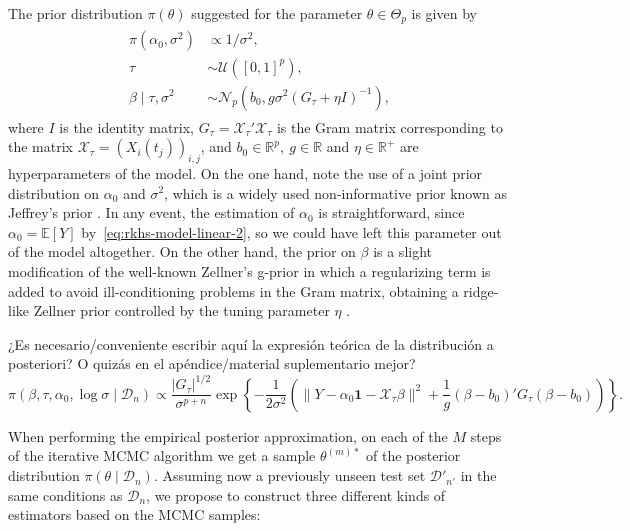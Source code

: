 \documentclass[ba]{imsart}
\numberwithin{equation}{section}
\theoremstyle{plain}
\newcommand{\R}{\mathbb{R}}
\newcommand{\E}{\mathbb{E}}
\newenvironment{comment}
{
\noindent \em \color{red}
}
{
\color{black}
}
\begin{document}
The prior distribution \(\pi(\theta)\) suggested for the parameter \(\theta \in \Theta_p\) is given by
\begin{align}\label{eq:prior-linear}
  \begin{split}
  \pi(\alpha_0, \sigma^2)              & \propto 1/\sigma^2,                                                     \\
  \tau                     & \sim \mathcal U([0, 1]^p),                                              \\
  \beta\mid \tau, \sigma^2 & \sim \mathcal N_p(b_0, g\sigma^2(G_\tau + \eta I)^{-1}),
\end{split}
\end{align}
where \(I\) is the identity matrix, \(G_\tau = \mathcal X_\tau'\mathcal X_\tau\) is the Gram matrix corresponding to the matrix \(\mathcal X_\tau = (X_i(t_j))_{i,j}\), and \(b_0\in \R^p, \ g \in \R\) and \(\eta \in \R^+\) are hyperparameters of the model. On the one hand, note the use of a joint prior distribution on \(\alpha_0\) and \(\sigma^2\), which is a widely used non-informative prior known as Jeffrey's prior \citep{jeffreys1946invariant}. In any event, the estimation of \(\alpha_0\) is straightforward, since \(\alpha_0 = \E[Y]\) by~\eqref{eq:rkhs-model-linear-2}, so we could have left this parameter out of the model altogether. On the other hand, the prior on \(\beta\) is a slight modification of the well-known Zellner's g-prior \citep{zellner1986assessing} in which a regularizing term is added to avoid ill-conditioning problems in the Gram matrix, obtaining a ridge-like Zellner prior controlled by the tuning parameter \(\eta\) \citep{baragatti2012study}.

\begin{comment}
¿Es necesario/conveniente escribir aquí la expresión teórica de la distribución a posteriori? O quizás en el apéndice/material suplementario mejor?
\[
\pi(\beta, \tau, \alpha_0, \log\sigma\mid \mathcal D_n) \propto \frac{|G_\tau|^{1/2}}{\sigma^{p+n}} \exp\left\{ -\frac{1}{2\sigma^2} \left(\|Y- \alpha_0\boldsymbol{1} - \mathcal X_\tau\beta\|^2 + \frac{1}{g}(\beta - b_0)'G_\tau(\beta - b_0) \right) \right\}.
\]

\end{comment}

When performing the empirical posterior approximation, on each of the \(M\) steps of the iterative MCMC algorithm we get a sample \(\theta^{(m)*}\) of the posterior distribution \(\pi(\theta\mid \mathcal D_n)\). Assuming now a previously unseen test set \(\mathcal D'_{n'}\) in the same conditions as \(\mathcal D_n\), we propose to construct three different kinds of estimators based on the MCMC samples:
\end{document}
